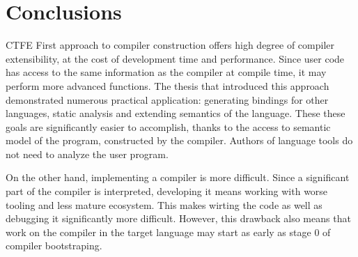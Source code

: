 \section{Conclusions}

CTFE First approach to compiler construction offers high degree of compiler extensibility, at the cost of development time and performance.
Since user code has access to the same information as the compiler at compile time, it may perform more advanced functions.
The thesis that introduced this approach \cite{grabski2020} demonstrated numerous practical application: generating bindings for other languages, static analysis and extending semantics of the language.
These these goals are significantly easier to accomplish, thanks to the access to semantic model of the program, constructed by the compiler.
Authors of language tools do not need to analyze the user program.

On the other hand, implementing a compiler is more difficult.
Since a significant part of the compiler is interpreted, developing it means working with worse tooling and less mature ecosystem.
This makes wirting the code as well as debugging it significantly more difficult.
However, this drawback also means that work on the compiler in the target language may start as early as stage 0 of compiler bootstraping\cite{puntambekar:compiler_design, novillo2007gcc}.

